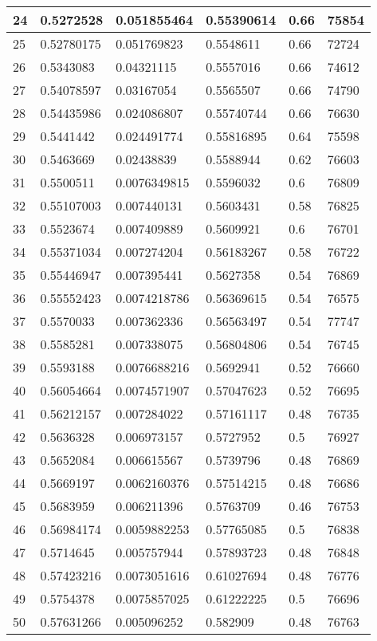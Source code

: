 \begin{longtable}{|l|l|l|l|l|l|}
24 & 0.5272528 & 0.051855464 & 0.55390614 & 0.66 & 75854 \\ \hline 
25 & 0.52780175 & 0.051769823 & 0.5548611 & 0.66 & 72724 \\ \hline 
26 & 0.5343083 & 0.04321115 & 0.5557016 & 0.66 & 74612 \\ \hline 
27 & 0.54078597 & 0.03167054 & 0.5565507 & 0.66 & 74790 \\ \hline 
28 & 0.54435986 & 0.024086807 & 0.55740744 & 0.66 & 76630 \\ \hline 
29 & 0.5441442 & 0.024491774 & 0.55816895 & 0.64 & 75598 \\ \hline 
30 & 0.5463669 & 0.02438839 & 0.5588944 & 0.62 & 76603 \\ \hline 
31 & 0.5500511 & 0.0076349815 & 0.5596032 & 0.6 & 76809 \\ \hline 
32 & 0.55107003 & 0.007440131 & 0.5603431 & 0.58 & 76825 \\ \hline 
33 & 0.5523674 & 0.007409889 & 0.5609921 & 0.6 & 76701 \\ \hline 
34 & 0.55371034 & 0.007274204 & 0.56183267 & 0.58 & 76722 \\ \hline 
35 & 0.55446947 & 0.007395441 & 0.5627358 & 0.54 & 76869 \\ \hline 
36 & 0.55552423 & 0.0074218786 & 0.56369615 & 0.54 & 76575 \\ \hline 
37 & 0.5570033 & 0.007362336 & 0.56563497 & 0.54 & 77747 \\ \hline 
38 & 0.5585281 & 0.007338075 & 0.56804806 & 0.54 & 76745 \\ \hline 
39 & 0.5593188 & 0.0076688216 & 0.5692941 & 0.52 & 76660 \\ \hline 
40 & 0.56054664 & 0.0074571907 & 0.57047623 & 0.52 & 76695 \\ \hline 
41 & 0.56212157 & 0.007284022 & 0.57161117 & 0.48 & 76735 \\ \hline 
42 & 0.5636328 & 0.006973157 & 0.5727952 & 0.5 & 76927 \\ \hline 
43 & 0.5652084 & 0.006615567 & 0.5739796 & 0.48 & 76869 \\ \hline 
44 & 0.5669197 & 0.0062160376 & 0.57514215 & 0.48 & 76686 \\ \hline 
45 & 0.5683959 & 0.006211396 & 0.5763709 & 0.46 & 76753 \\ \hline 
46 & 0.56984174 & 0.0059882253 & 0.57765085 & 0.5 & 76838 \\ \hline 
47 & 0.5714645 & 0.005757944 & 0.57893723 & 0.48 & 76848 \\ \hline 
48 & 0.57423216 & 0.0073051616 & 0.61027694 & 0.48 & 76776 \\ \hline 
49 & 0.5754378 & 0.0075857025 & 0.61222225 & 0.5 & 76696 \\ \hline 
50 & 0.57631266 & 0.005096252 & 0.582909 & 0.48 & 76763 \\ \hline 
\end{longtable}